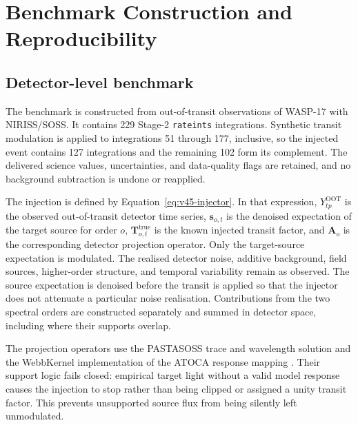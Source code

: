 \section{Benchmark Construction and Reproducibility}
\label{app:benchmarking}

\subsection{Detector-level benchmark}

The benchmark is constructed from out-of-transit observations of WASP-17 with
NIRISS/SOSS. It contains 229 Stage-2 \texttt{rateints} integrations. Synthetic
transit modulation is applied to integrations 51 through 177, inclusive, so
the injected event contains 127 integrations and the remaining 102 form its
complement. The delivered science values, uncertainties, and data-quality
flags are retained, and no background subtraction is undone or reapplied.

The injection is defined by Equation~\ref{eq:v45-injector}. In that
expression, $Y^{\mathrm{OOT}}_{tp}$ is the observed out-of-transit detector
time series, $\bm{s}_{o,t}$ is the denoised expectation of the target source
for order $o$, $\bm{T}^{\mathrm{true}}_{o,t}$ is the known injected transit
factor, and $\bm{A}_o$ is the corresponding detector projection operator.
Only the target-source expectation is modulated. The realised detector noise,
additive background, field sources, higher-order structure, and temporal
variability remain as observed. The source expectation is denoised before the
transit is applied so that the injector does not attenuate a particular noise
realisation. Contributions from the two spectral orders are constructed
separately and summed in detector space, including where their supports
overlap.

The projection operators use the PASTASOSS trace and wavelength solution
\citep{BainesEtAl2023Trace,BainesEtAl2023Wavelength} and the WebbKernel
implementation of the ATOCA response mapping
\citep{DarveauBernierEtAl2022,JWSTPipeline2025}. Their support logic fails
closed: empirical target light without a valid model response causes the
injection to stop rather than being clipped or assigned a unity transit
factor. This prevents unsupported source flux from being silently left
unmodulated.

